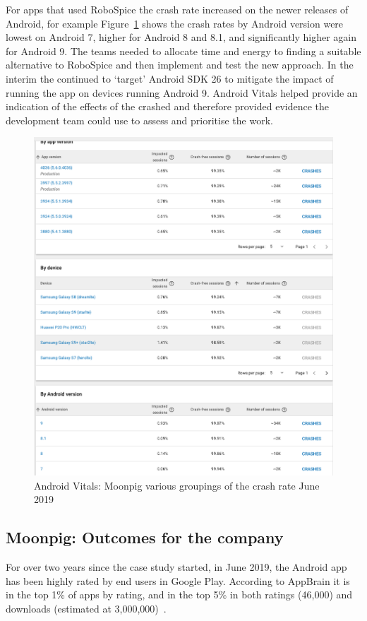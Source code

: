 For apps that used RoboSpice the crash rate increased on the newer releases of Android, for example Figure~\ref{fig:av-moonpig-crash-rate-groupings} shows the crash rates by Android version were lowest on Android 7, higher for Android 8 and 8.1, and significantly higher again for Android 9. The teams needed to allocate time and energy to finding a suitable alternative to RoboSpice and then implement and test the new approach. In the interim the continued to `target' Android SDK 26 to mitigate the impact of running the app on devices running Android 9. Android Vitals helped provide an indication of the effects of the crashed and therefore provided evidence the development team could use to assess and prioritise the work.

\begin{figure}
    \centering
    \includegraphics[width=13cm]{images/android-vitals-screenshots/moonpig/Screenshot 2019-06-10 at 15.41.23.png}
    \caption{Android Vitals: Moonpig various groupings of the crash rate  June 2019}
    \label{fig:av-moonpig-crash-rate-groupings}
\end{figure}

\subsection{Moonpig: Outcomes for the company}
For over two years since the case study started, in June 2019, the Android app has been highly rated by end users in Google Play. According to AppBrain it is in the top 1\% of apps by rating, and in the top 5\% in both ratings (46,000) and downloads (estimated at 3,000,000)~\citep{appbrain_moonpig}.

